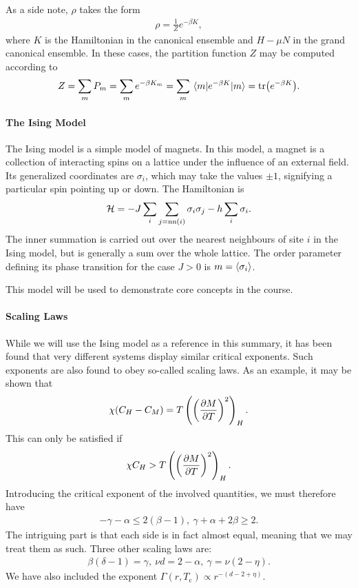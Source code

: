 As a side note, $\rho$ takes the form
\begin{align*}
	\rho = \frac{1}{Z}e^{-\beta K},
\end{align*}
where $K$ is the Hamiltonian in the canonical ensemble and $H - \mu N$ in the grand canonical ensemble. In these cases, the partition function $Z$ may be computed according to
\begin{align*}
	Z = \sum\limits_{m}P_{m} = \sum\limits_{m}e^{-\beta K_{m}} = \sum\limits_{m}\mel{m}{e^{-\beta K}}{m} = \tr(e^{-\beta K}).
\end{align*}

\paragraph{The Ising Model}
The Ising model is a simple model of magnets. In this model, a magnet is a collection of interacting spins on a lattice under the influence of an external field. Its generalized coordinates are $\sigma_{i}$, which may take the values $\pm 1$, signifying a particular spin pointing up or down. The Hamiltonian is
\begin{align*}
	\mathcal{H} = -J\sum\limits_{i}\sum\limits_{j = \text{nn}(i)}\sigma_{i}\sigma_{j} - h\sum\limits_{i}\sigma_{i}.
\end{align*}
The inner summation is carried out over the nearest neighbours of site $i$ in the Ising model, but is generally a sum over the whole lattice. The order parameter defining its phase transition for the case $J > 0$ is $m = \expval{\sigma_{i}}$.

This model will be used to demonstrate core concepts in the course.

\paragraph{Scaling Laws}
While we will use the Ising model as a reference in this summary, it has been found that very different systems display similar critical exponents. Such exponents are also found to obey so-called scaling laws. As an example, it may be shown that
\begin{align*}
	\chi(C_{H} - C_{M}) = T\left(\left(\pdv{M}{T}\right)^{2}\right)_{H}.
\end{align*}
This can only be satisfied if
\begin{align*}
	\chi C_{H} > T\left(\left(\pdv{M}{T}\right)^{2}\right)_{H}.
\end{align*}
Introducing the critical exponent of the involved quantities, we must therefore have
\begin{align*}
	-\gamma - \alpha \leq 2(\beta - 1),\ \gamma + \alpha + 2\beta \geq 2.
\end{align*}
The intriguing part is that each side is in fact almost equal, meaning that we may treat them as such. Three other scaling laws are:
\begin{align*}
	\beta(\delta - 1) = \gamma,\ \nu d = 2 - \alpha,\ \gamma = \nu(2 - \eta).
\end{align*}
We have also included the exponent $\Gamma(r, T_{\text{c}}) \propto r^{-(d - 2 + \eta)}$.

